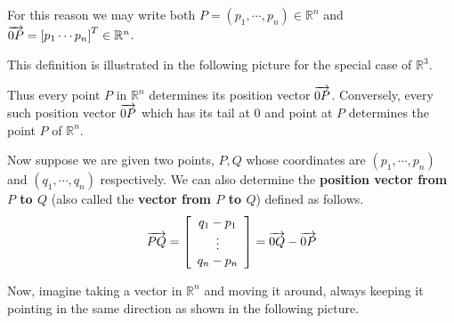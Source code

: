 For this reason we may write both $P=\left( p_{1},\cdots ,p_{n}\right)  \in \mathbb{R}^{n}$
and  $\overrightarrow{0P} = \left[ p_{1} \cdots p_{n} \right]^T \in \mathbb{R}^{n}$. 

This definition is illustrated in the following picture for the
special case of $\mathbb{R}^{3}$.

\begin{center}
\end{center}

Thus every point $P$ in $\mathbb{R}^{n}$ determines its position
vector $\overrightarrow{0P}$. Conversely, every such position vector $\overrightarrow{0P}$
which has its tail at $0$ and point at $P$ determines the point $P$ of
$\mathbb{R}^{n}$.

Now suppose we are given two points, $P,Q$ whose
coordinates are $\left( p_{1},\cdots ,p_{n}\right) $ and $\left(
q_{1},\cdots ,q_{n}\right) $ respectively. We can also determine the
\textbf{position vector from $P$ to $Q$} (also called the \textbf{vector from $P$ to $Q$}) defined as follows.
\begin{equation*}
\overrightarrow{PQ} = \left[ \begin{array}{c}
q_{1}-p_{1}\\
 \vdots \\
q_{n}-p_{n}
\end{array}
\right] = \overrightarrow{0Q} - \overrightarrow{0P}
\end{equation*}

Now, imagine taking a vector in $\mathbb{R}^n$ and moving it around, always
keeping it pointing in the same direction as shown in the following picture.

\begin{center}
\end{center}

